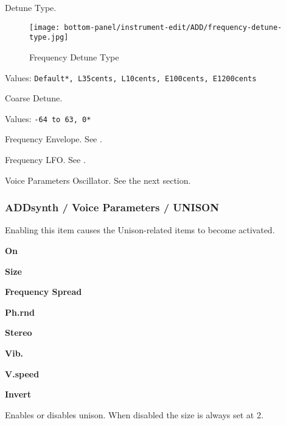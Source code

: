    Detune Type.

\begin{figure}[H]
   \centering
   \texttt{[image: bottom-panel/instrument-edit/ADD/frequency-detune-type.jpg]}
   \caption{Frequency Detune Type}
   \label{fig:frequency_detune_tYpe}
\end{figure}

   Values: \texttt{Default*, L35cents, L10cents, E100cents, E1200cents}

   Coarse Detune.

   Values: \texttt{-64 to 63, 0*}

   Frequency Envelope.
   See .

   Frequency LFO.
   See .

   Voice Parameters Oscillator.
   See the next section.

\subsubsection{ADDsynth / Voice Parameters / UNISON}
\label{subsubsec:addsynth_voice_parameters_unison}
   Enabling this item causes the Unison-related items to become
   activated.

   \begin{enumber}
      \item \textbf{On}
      \item \textbf{Size}
      \item \textbf{Frequency Spread}
      \item \textbf{Ph.rnd}
      \item \textbf{Stereo}
      \item \textbf{Vib.}
      \item \textbf{V.speed}
      \item \textbf{Invert}
   \end{enumber}

   \setcounter{ItemCounter}{0}      %

   Enables or disables unison. When disabled the size is always set at 2.


